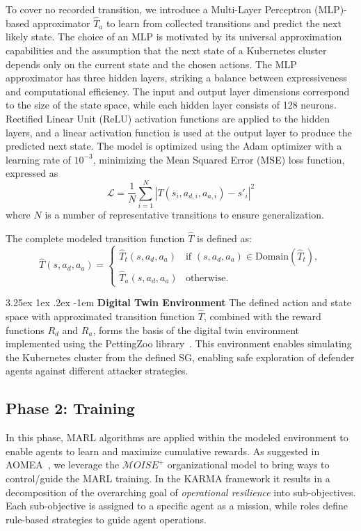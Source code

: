 \documentclass[conference]{IEEEtran}
\makeatletter
\renewcommand\paragraph{\@startsection{paragraph}{5}{\z@}%
  {3.25ex \@plus1ex \@minus.2ex}%
  {-1em}%
  {\normalfont\normalsize\bfseries}}
\makeatother
\begin{document}
To cover no recorded transition, we introduce a Multi-Layer Perceptron (MLP)-based approximator $\hat{T}_a$ to learn from collected transitions and predict the next likely state. The choice of an MLP is motivated by its universal approximation capabilities and the assumption that the next state of a Kubernetes cluster depends only on the current state and the chosen actions.
The MLP approximator has three hidden layers, striking a balance between expressiveness and computational efficiency. The input and output layer dimensions correspond to the size of the state space, while each hidden layer consists of 128 neurons. Rectified Linear Unit (ReLU) activation functions are applied to the hidden layers, and a linear activation function is used at the output layer to produce the predicted next state. The model is optimized using the Adam optimizer with a learning rate of $10^{-3}$, minimizing the Mean Squared Error (MSE) loss function, expressed as
$$
\mathcal{L} = \frac{1}{N} \sum_{i=1}^N |T(s_i, a_{d,i}, a_{a,i}) - s'_i|^2
$$
where $N$ is a number of representative transitions to ensure generalization.

The complete modeled transition function $\hat{T}$ is defined as:
$$
\hat{T}(s, a_d, a_a) = 
\begin{cases} 
\hat{T}_t(s, a_d, a_a) & \text{if } (s, a_d, a_a) \in \text{Domain}(\hat{T}_t), \\
\hat{T}_a(s, a_d, a_a) & \text{otherwise}.
\end{cases}
$$

\noindent \paragraph{\textbf{Digital Twin Environment}} The defined action and state space with approximated transition function $\hat{T}$, combined with the reward functions $R_d$ and $R_a$, forms the basis of the digital twin environment implemented using the PettingZoo library~\cite{Terry2021}. This environment enables simulating the Kubernetes cluster from the defined SG, enabling safe exploration of defender agents against different attacker strategies.



\subsection{Phase 2: Training}
\label{sec:training}

In this phase, MARL algorithms are applied within the modeled environment to enable agents to learn and maximize cumulative rewards. As suggested in AOMEA~\cite{soule2024aomea}, we leverage the $\mathcal{M}OISE^+$ organizational model to bring ways to control/guide the MARL training. In the KARMA framework it results in a decomposition of the overarching goal of \textit{operational resilience} into sub-objectives. Each sub-objective is assigned to a specific agent as a mission, while roles define rule-based strategies to guide agent operations.\\
\end{document}
